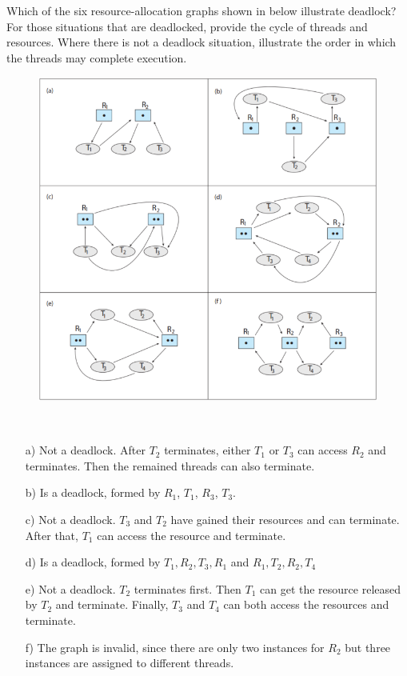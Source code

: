 \begin{exercise}[]{Which of the six resource-allocation graphs shown in below illustrate deadlock? For those situations that are deadlocked, provide the cycle of threads and resources. Where there is not a deadlock situation, illustrate the order in which the threads may complete execution.   
    \begin{figure}[h]
        \begin{center}
            \includegraphics[scale=1]{fig8.18.png}
        \end{center}
    \end{figure}
    }
  \begin{solution}
  \par{~}
  \begin{enumerate}
      \item[a)] Not a deadlock. After $T_2$ terminates, either $T_1$ or $T_3$ can access $R_2$ and terminates. Then the remained threads can also terminate.
      \item[b)] Is a deadlock, formed by $R_1$, $T_1$, $R_3$, $T_3$.
      \item[c)] Not a deadlock.  $T_3$ and $T_2$ have gained their resources and can terminate. After that, $T_1$ can access the resource and terminate.
      \item[d)] Is a deadlock, formed by $T_1,R_2,T_3,R_1$ and $R_1,T_2,R_2,T_4$
      \item[e)] Not a deadlock. $T_2$ terminates first. Then $T_1$ can get the resource released by $T_2$ and terminate. Finally, $T_3$ and $T_4$ can both access the resources and terminate.
      \item[f)] The graph is invalid, since there are only two instances for $R_2$ but three instances are assigned to different threads. 
  \end{enumerate}
  \end{solution}
  \label{ex3}
\end{exercise}